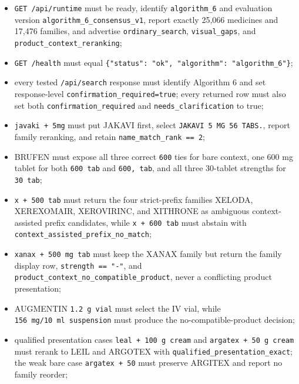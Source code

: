 \begin{itemize}
\tightlist
\item
  \texttt{GET\ /api/runtime} must be ready, identify \texttt{algorithm\_\allowbreak{}6} and evaluation version \texttt{algorithm\_\allowbreak{}6\_\allowbreak{}consensus\_\allowbreak{}v1}, report exactly 25,066 medicines and 17,476 families, and advertise \texttt{ordinary\_\allowbreak{}search}, \texttt{visual\_\allowbreak{}gaps}, and \texttt{product\_\allowbreak{}context\_\allowbreak{}reranking};
\item
  \texttt{GET\ /health} must equal \texttt{\{"status":\ "ok",\ "algorithm":\ "algorithm\_\allowbreak{}6"\}};
\item
  every tested \texttt{/api/search} response must identify Algorithm 6 and set
  response-level \texttt{confirmation\_\allowbreak{}required=true}; every returned row must also set
  both \texttt{confirmation\_\allowbreak{}required} and \texttt{needs\_\allowbreak{}clarification} to true;
\item
  \texttt{javaki\ +\ 5mg} must put JAKAVI first, select \texttt{JAKAVI\ 5\ MG\ 56\ TABS.}, report family reranking, and retain \texttt{name\_\allowbreak{}match\_\allowbreak{}rank\ ==\ 2};
\item
  BRUFEN must expose all three correct \texttt{600} ties for bare context, one 600 mg tablet for both \texttt{600\ tab} and \texttt{600,\ tab}, and all three 30-tablet strengths for \texttt{30\ tab};
\item
  \texttt{x\ +\ 500\ tab} must return the four strict-prefix families XELODA, XEREXOMAIR, XEROVIRINC, and XITHRONE as ambiguous context-assisted prefix candidates, while \texttt{x\ +\ 600\ tab} must abstain with \texttt{context\_\allowbreak{}assisted\_\allowbreak{}prefix\_\allowbreak{}no\_\allowbreak{}match};
\item
  \texttt{xanax\ +\ 500\ mg\ tab} must keep the XANAX family but return the family display row, \texttt{strength\ ==\ "-"}, and \texttt{product\_\allowbreak{}context\_\allowbreak{}no\_\allowbreak{}compatible\_\allowbreak{}product}, never a conflicting product presentation;
\item
  AUGMENTIN \texttt{1.2\ g\ vial} must select the IV vial, while \texttt{156\ mg/10\ ml\ suspension} must produce the no-compatible-product decision;
\item
  qualified presentation cases \texttt{leal\ +\ 100\ g\ cream} and \texttt{argatex\ +\ 50\ g\ cream} must rerank to LEIL and ARGOTEX with \texttt{qualified\_\allowbreak{}presentation\_\allowbreak{}exact}; the weak bare case \texttt{argatex\ +\ 50} must preserve ARGITEX and report no family reorder;

\end{itemize}
